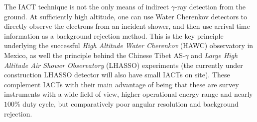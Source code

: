 The IACT technique is not the only means of indirect $\gamma$-ray detection from the ground. At sufficiently high altitude, one can use Water Cherenkov detectors to directly observe the electrons from an incident shower, and then use arrival time information as a background rejection method. This is the key principle underlying the successful \textit{High Altitude Water Cherenkov} (HAWC) observatory in Mexico, as well the principle behind the Chinese Tibet AS-$\gamma$ and \textit{Large High Altitude Air Shower Observatory} (LHASSO) experiments (the currently under construction LHASSO detector will also have small IACTs on site). These complement IACTs with their main advantage of being that these are survey instruments with a wide field of view, higher operational energy range and nearly $100\%$ duty cycle, but comparatively poor angular resolution and background rejection. 

